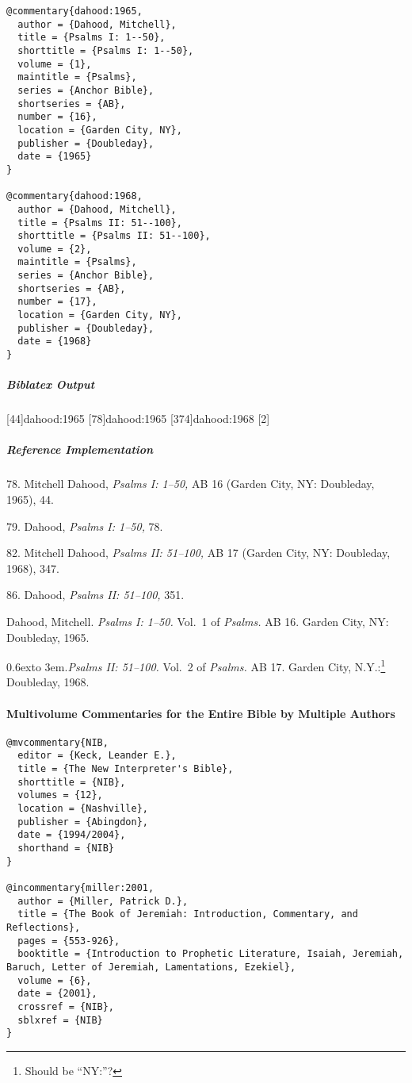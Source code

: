 \documentclass[a4paper]{article}
\renewcommand*{\bibnamedash}{%
  \leavevmode\raise 0.6ex\hbox to 3em{\hrulefill}.\space}
\newenvironment{biboutput}{%
  \subparagraph{Biblatex Output}
}{\color{black}}
\newenvironment{refimp}{%
  \subparagraph{Reference Implementation}
  \color{reference-colour}
  \rm
}{\par\color{black}}
\begin{document}
\medskip

\begin{lstlisting}
@commentary{dahood:1965,
  author = {Dahood, Mitchell},
  title = {Psalms I: 1--50},
  shorttitle = {Psalms I: 1--50},
  volume = {1},
  maintitle = {Psalms},
  series = {Anchor Bible},
  shortseries = {AB},
  number = {16},
  location = {Garden City, NY},
  publisher = {Doubleday},
  date = {1965}
}

@commentary{dahood:1968,
  author = {Dahood, Mitchell},
  title = {Psalms II: 51--100},
  shorttitle = {Psalms II: 51--100},
  volume = {2},
  maintitle = {Psalms},
  series = {Anchor Bible},
  shortseries = {AB},
  number = {17},
  location = {Garden City, NY},
  publisher = {Doubleday},
  date = {1968}
}
\end{lstlisting}

\begin{biboutput}
  [44]{dahood:1965}
  [78]{dahood:1965}
  [374]{dahood:1968}
  [2]{%
    }
\end{biboutput}

\begin{refimp}
  78. Mitchell Dahood, \emph{Psalms I: 1–50,} AB 16 (Garden City, NY:
  Doubleday, 1965), 44.

  79. Dahood, \emph{Psalms I: 1–50,} 78.

  82. Mitchell Dahood, \emph{Psalms II: 51–100,} AB 17 (Garden City, NY:
  Doubleday, 1968), 347.

  86. Dahood, \emph{Psalms II: 51–100,} 351.

  \hangindent\bibindent Dahood, Mitchell. \emph{Psalms I: 1–50.} Vol.~1 of
  \emph{Psalms.} AB 16. Garden City, NY: Doubleday, 1965.

  \hangindent\bibindent\bibnamedash \emph{Psalms II: 51–100.} Vol.~2 of
  \emph{Psalms.} AB 17. Garden City, N.Y.:\footnote{Should be “NY:”?}
  Doubleday, 1968.

\end{refimp}

\paragraph{Multivolume Commentaries for the Entire Bible by Multiple Authors}

\begin{lstlisting}
@mvcommentary{NIB,
  editor = {Keck, Leander E.},
  title = {The New Interpreter's Bible},
  shorttitle = {NIB},
  volumes = {12},
  location = {Nashville},
  publisher = {Abingdon},
  date = {1994/2004},
  shorthand = {NIB}
}

@incommentary{miller:2001,
  author = {Miller, Patrick D.},
  title = {The Book of Jeremiah: Introduction, Commentary, and Reflections},
  pages = {553-926},
  booktitle = {Introduction to Prophetic Literature, Isaiah, Jeremiah, Baruch, Letter of Jeremiah, Lamentations, Ezekiel},
  volume = {6},
  date = {2001},
  crossref = {NIB},
  sblxref = {NIB}
}
\end{lstlisting}
\end{document}
